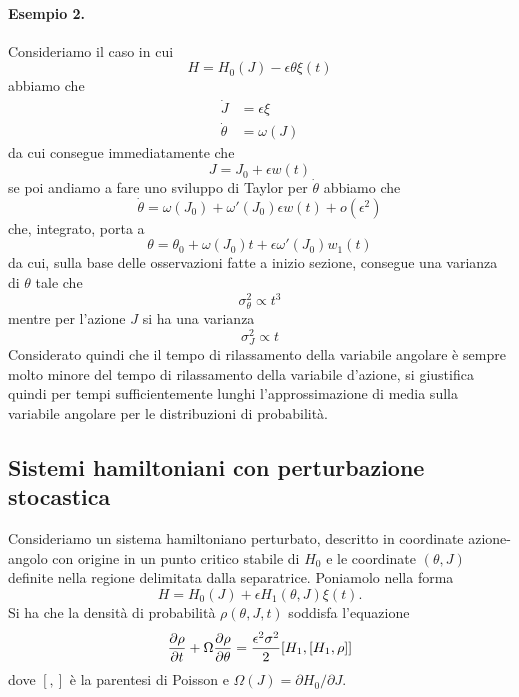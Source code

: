 \documentclass[10pt,a4paper]{article}
\begin{document}
\paragraph{Esempio 2.}
Consideriamo il caso in cui
\begin{equation}
	H = H_0(J) - \epsilon \theta \xi(t)
\end{equation}
abbiamo che
\begin{align}
	\dot{J} &= \epsilon\xi \\
	\dot{\theta} &= \omega(J)
\end{align}
da cui consegue immediatamente che
\begin{equation}
	J = J_0 + \epsilon w(t)
\end{equation}
se poi andiamo a fare uno sviluppo di Taylor per \(\dot{\theta}\) abbiamo che
\begin{equation}
	\dot{\theta} = \omega(J_0) + \omega'(J_0)\epsilon w(t) + o(\epsilon^2)
\end{equation}
che, integrato, porta a
\begin{equation}
	\theta = \theta_0 + \omega(J_0)t + \epsilon \omega'(J_0) w_1(t)
\end{equation}
da cui, sulla base delle osservazioni fatte a inizio sezione, consegue una varianza di \(\theta\) tale che
\begin{equation}
	\sigma_{\theta}^2 \propto t^3
\end{equation}
mentre per l'azione \(J\) si ha una varianza
\begin{equation}
	\sigma_{J}^2 \propto t
\end{equation}
Considerato quindi che il tempo di rilassamento della variabile angolare è sempre molto minore del tempo di rilassamento della variabile d'azione, si giustifica quindi per tempi sufficientemente lunghi l'approssimazione di media sulla variabile angolare per le distribuzioni di probabilità.


\subsection{Sistemi hamiltoniani con perturbazione stocastica}
\label{sec:hamiltoniana_stocastica}
Consideriamo un sistema hamiltoniano perturbato, descritto in coordinate azione-angolo con origine in un punto critico stabile di \(H_0\) e le coordinate \((\theta, J)\) definite nella regione delimitata dalla separatrice. Poniamolo nella forma
\begin{equation}
	H = H_0(J) + \epsilon H_1(\theta, J)\xi(t).
\end{equation}
Si ha che la densità di probabilità \(\rho(\theta, J, t)\) soddisfa l'equazione
\begin{equation}
	\pdv{\rho}{t} + \Omega \pdv{\rho}{\theta} = \frac{\epsilon^2 \sigma^2}{2}[H_1, [H_1,\rho]] 
\end{equation}
dove \([,]\) è la parentesi di Poisson e \(\Omega(J) = \partial H_0/\partial J\).
\end{document}
